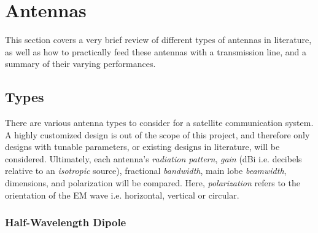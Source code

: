 \graphicspath{{./figures}}

\section{Antennas}\label{sec:antenna_theory}

This section covers a very brief review of different types of antennas in literature, as well as how to practically feed these antennas with a transmission line, and a summary of their varying performances.

\subsection{Types}\label{sec:antenna_types}
There are various antenna types to consider for a satellite communication system. A highly customized design is out of the scope of this project, and therefore only designs with tunable parameters, or existing designs in literature, will be considered. Ultimately, each antenna's \textit{radiation pattern}, \textit{gain} (dBi i.e. decibels relative to an \textit{isotropic} source), fractional \textit{bandwidth}, main lobe \textit{beamwidth}, dimensions, and polarization will be compared. Here, \textit{polarization} refers to the orientation of the EM wave i.e. horizontal, vertical or circular.

\subsubsection{Half-Wavelength Dipole}

